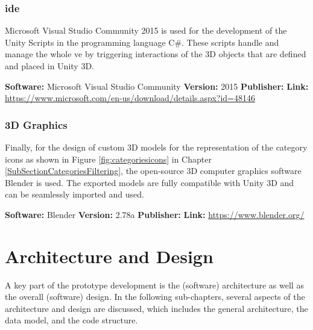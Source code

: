 \subsubsection{\gls{ide}}
Microsoft Visual Studio Community 2015 is used for the development of the Unity Scripts in the programming language C\#. These scripts handle and manage the whole \gls{ve} by triggering interactions of the 3D objects that are defined and placed in Unity 3D.

\textbf{Software:} Microsoft Visual Studio Community \newline
\textbf{Version:} 2015 \newline
\textbf{Publisher:} \cite{Microsoft2015} \newline
\textbf{Link:} \url{https://www.microsoft.com/en-us/download/details.aspx?id=48146}
 

\subsubsection{3D Graphics}

Finally, for the design of custom 3D models for the representation of the category icons as shown in Figure \ref{fig:categoriesicons} in Chapter \ref{SubSectionCategoriesFiltering}, the  open-source 3D computer graphics software Blender is used. The exported models are fully compatible with Unity 3D and can be seamlessly imported and used.

\textbf{Software:} Blender \newline
\textbf{Version:} 2.78a \newline
\textbf{Publisher:} \cite{Blender2016} \newline
\textbf{Link:} \url{https://www.blender.org/}



\section{Architecture and Design}

A key part of the prototype development is the (software) architecture as well as the overall (software) design. In the following sub-chapters, several aspects of the architecture and design are discussed, which includes the general architecture, the data model, and the code structure.


